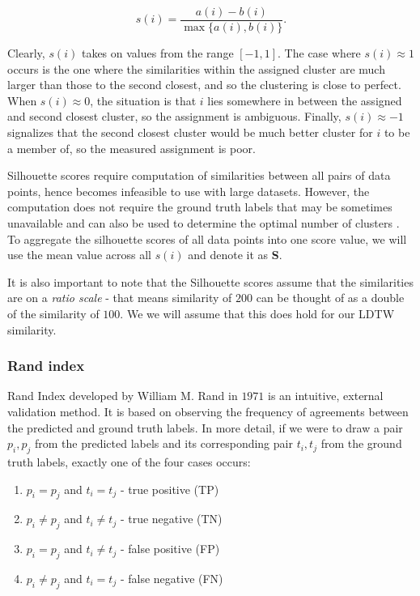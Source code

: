 \begin{equation}
    s(i) = \frac{a(i) - b(i)}{\max \{ a(i), b(i) \} }.
\end{equation}

Clearly, $s(i)$ takes on values from the range $[-1, 1]$. The case where $s(i) \approx 1$ occurs is the one where the similarities within the assigned cluster are much larger than those to the second closest, and so the clustering is close to perfect. When $s(i) \approx 0$, the situation is that $i$ lies somewhere in between the assigned and second closest cluster, so the assignment is ambiguous. Finally, $s(i) \approx -1$ signalizes that the second closest cluster would be much better cluster for $i$ to be a member of, so the measured assignment is poor.

Silhouette scores require computation of similarities between all pairs of data points, hence becomes infeasible to use with large datasets. However, the computation does not require the ground truth labels that may be sometimes unavailable and can also be used to determine the optimal number of clusters \cite{silhouette1987}. To aggregate the silhouette scores of all data points into one score value, we will use the mean value across all $s(i)$ and denote it as \textbf{S}.

It is also important to note that the Silhouette scores assume that the similarities are on a \textit{ratio scale} - that means similarity of $200$ can be thought of as a double of the similarity of $100$. We we will assume that this does hold for our LDTW similarity.

\subsubsection{Rand index}
Rand Index developed by William M. Rand in $1971$ \cite{randIndex} is an intuitive, external validation method. It is based on observing the frequency of agreements between the predicted and ground truth labels. In more detail, if we were to draw a pair $p_i, p_j$ from the predicted labels and its corresponding pair $t_i, t_j$ from the ground truth labels, exactly one of the four cases occurs:

\begin{enumerate}
    \item $p_i = p_j$ and $t_i = t_j$ - true positive (TP)
    \item $p_i \neq p_j$ and $t_i \neq t_j$ - true negative (TN)
    \item $p_i = p_j$ and $t_i \neq t_j$ - false positive (FP)
    \item $p_i \neq p_j$ and $t_i = t_j$ - false negative (FN)
\end{enumerate}

